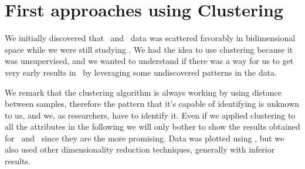 \section{First approaches using Clustering}
We initially discovered that \an\ and \cnmod\ data was scattered favorably in bidimensional space
while we were still studying \qrp. We had the idea to use clustering because it was unsupervised,
and we wanted to understand if there was a way for us to get very early results in \qlp\ by
leveraging some undiscovered patterns in the data.

We remark that the clustering algorithm is always working by using distance between samples,
therefore the pattern that it's capable of identifying is unknown to us, and we, as researchers,
have to identify it. Even if we applied clustering to all the attributes in the following we will
only bother to show the results obtained for \an\ and \cnmod\ since they are the more promising.
Data was plotted using \pca, but we also used other dimensionality reduction techniques, generally
with inferior results.

